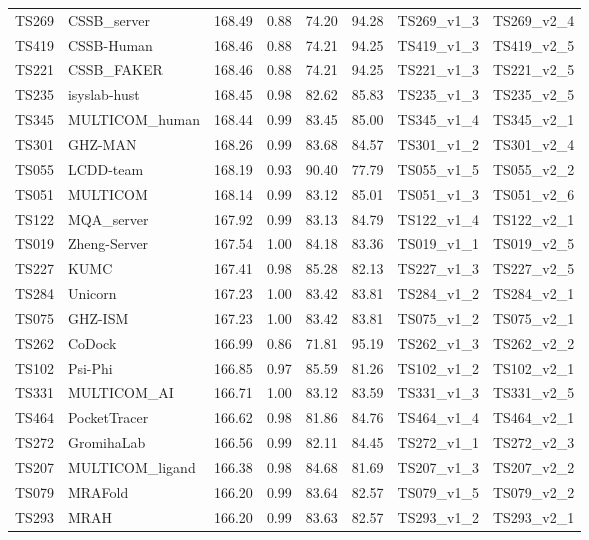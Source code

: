 \begin{table}[ht]
{\begin{tabular}{llllllll}
TS269 & CSSB\_server & 168.49 & 0.88 & 74.20 & 94.28 & TS269\_v1\_3 & TS269\_v2\_4 \\ 
TS419 & CSSB-Human & 168.46 & 0.88 & 74.21 & 94.25 & TS419\_v1\_3 & TS419\_v2\_5 \\ 
TS221 & CSSB\_FAKER & 168.46 & 0.88 & 74.21 & 94.25 & TS221\_v1\_3 & TS221\_v2\_5 \\ 
TS235 & isyslab-hust & 168.45 & 0.98 & 82.62 & 85.83 & TS235\_v1\_3 & TS235\_v2\_5 \\ 
TS345 & MULTICOM\_human & 168.44 & 0.99 & 83.45 & 85.00 & TS345\_v1\_4 & TS345\_v2\_1 \\ 
TS301 & GHZ-MAN & 168.26 & 0.99 & 83.68 & 84.57 & TS301\_v1\_2 & TS301\_v2\_4 \\ 
TS055 & LCDD-team & 168.19 & 0.93 & 90.40 & 77.79 & TS055\_v1\_5 & TS055\_v2\_2 \\ 
TS051 & MULTICOM & 168.14 & 0.99 & 83.12 & 85.01 & TS051\_v1\_3 & TS051\_v2\_6 \\ 
TS122 & MQA\_server & 167.92 & 0.99 & 83.13 & 84.79 & TS122\_v1\_4 & TS122\_v2\_1 \\ 
TS019 & Zheng-Server & 167.54 & 1.00 & 84.18 & 83.36 & TS019\_v1\_1 & TS019\_v2\_5 \\ 
TS227 & KUMC & 167.41 & 0.98 & 85.28 & 82.13 & TS227\_v1\_3 & TS227\_v2\_5 \\ 
TS284 & Unicorn & 167.23 & 1.00 & 83.42 & 83.81 & TS284\_v1\_2 & TS284\_v2\_1 \\ 
TS075 & GHZ-ISM & 167.23 & 1.00 & 83.42 & 83.81 & TS075\_v1\_2 & TS075\_v2\_1 \\ 
TS262 & CoDock & 166.99 & 0.86 & 71.81 & 95.19 & TS262\_v1\_3 & TS262\_v2\_2 \\ 
TS102 & Psi-Phi & 166.85 & 0.97 & 85.59 & 81.26 & TS102\_v1\_2 & TS102\_v2\_1 \\ 
TS331 & MULTICOM\_AI & 166.71 & 1.00 & 83.12 & 83.59 & TS331\_v1\_3 & TS331\_v2\_5 \\ 
TS464 & PocketTracer & 166.62 & 0.98 & 81.86 & 84.76 & TS464\_v1\_4 & TS464\_v2\_1 \\ 
TS272 & GromihaLab & 166.56 & 0.99 & 82.11 & 84.45 & TS272\_v1\_1 & TS272\_v2\_3 \\ 
TS207 & MULTICOM\_ligand & 166.38 & 0.98 & 84.68 & 81.69 & TS207\_v1\_3 & TS207\_v2\_2 \\ 
TS079 & MRAFold & 166.20 & 0.99 & 83.64 & 82.57 & TS079\_v1\_5 & TS079\_v2\_2 \\ 
TS293 & MRAH & 166.20 & 0.99 & 83.63 & 82.57 & TS293\_v1\_2 & TS293\_v2\_1 \\ 

\end{tabular}}
\end{table}
